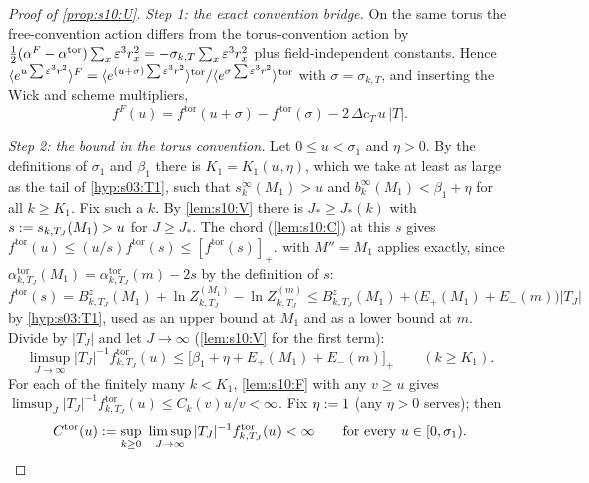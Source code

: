 \begin{proof}[Proof of \cref{prop:s10:U}]
\emph{Step 1: the exact convention bridge.} On the same torus the free-convention action differs from the torus-convention action by $\frac12(\alpha^F-\alpha^{\mathrm{tor}})\sum_x\varepsilon^3r_x^2=-\sigma_{k,T}\sum_x\varepsilon^3r_x^2$ plus field-independent constants. Hence $\langle e^{u\sum\varepsilon^3r^2}\rangle^F=\langle e^{(u+\sigma)\sum\varepsilon^3r^2}\rangle^{\mathrm{tor}}/\langle e^{\sigma\sum\varepsilon^3r^2}\rangle^{\mathrm{tor}}$ with $\sigma=\sigma_{k,T}$, and inserting the Wick and scheme multipliers,
\begin{equation}\label{eq:s10:bridge}
f^F(u)=f^{\mathrm{tor}}(u+\sigma)-f^{\mathrm{tor}}(\sigma)-2\,\Delta c_T\,u\,|T| .
\end{equation}

\emph{Step 2: the bound in the torus convention.} Let $0\le u<\sigma_1$ and $\eta>0$. By the definitions of $\sigma_1$ and $\beta_1$ there is $K_1=K_1(u,\eta)$, which we take at least as large as the tail of \cref{hyp:s03:T1}, such that $s^\infty_k(M_1)>u$ and $b^\infty_k(M_1)<\beta_1+\eta$ for all $k\ge K_1$. Fix such a $k$. By \cref{lem:s10:V} there is $J_*\ge J_*(k)$ with $s:= s_{k,T_J}(M_1)>u$ for $J\ge J_*$. The chord (\cref{lem:s10:C}) at this $s$ gives $f^{\mathrm{tor}}(u)\le(u/s)f^{\mathrm{tor}}(s)\le[f^{\mathrm{tor}}(s)]_+$.  with $M''=M_1$ applies exactly, since $\alpha^{\mathrm{tor}}_{k,T_J}(M_1)=\alpha^{\mathrm{tor}}_{k,T_J}(m)-2s$ by the definition of $s$:
\[
f^{\mathrm{tor}}(s)=B^z_{k,T_J}(M_1)+\ln Z^{(M_1)}_{k,T_J}-\ln Z^{(m)}_{k,T_J}\le B^z_{k,T_J}(M_1)+\big(E_+(M_1)+E_-(m)\big)|T_J|
\]
by \cref{hyp:s03:T1}, used as an upper bound at $M_1$ and as a lower bound at $m$. Divide by $|T_J|$ and let $J\to\infty$ (\cref{lem:s10:V} for the first term):
\[
\limsup_{J\to\infty}|T_J|^{-1}f^{\mathrm{tor}}_{k,T_J}(u)\le\big[\beta_1+\eta+E_+(M_1)+E_-(m)\big]_+\qquad(k\ge K_1).
\]
For each of the finitely many $k<K_1$, \cref{lem:s10:F} with any $v\ge u$ gives $\limsup_J|T_J|^{-1}f^{\mathrm{tor}}_{k,T_J}(u)\le C_k(v)u/v<\infty$. Fix $\eta:=1$ (any $\eta>0$ serves); then
\[
C^{\mathrm{tor}}(u)\defeq\sup_{k\ge0}\ \limsup_{J\to\infty}|T_J|^{-1}f^{\mathrm{tor}}_{k,T_J}(u)<\infty\qquad\text{for every }u\in[0,\sigma_1).
\]


\end{proof}
